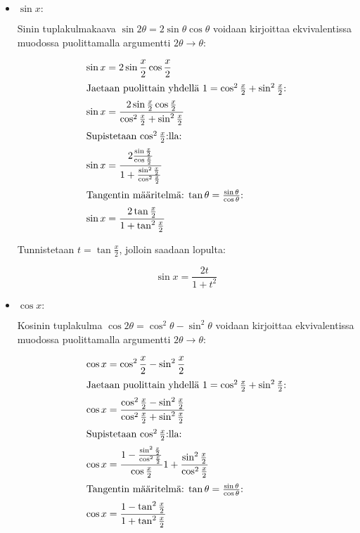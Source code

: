 \documentclass[../integrointiopas.tex]{subfiles}
\begin{document}
	\begin{itemize}
		\item \underline{$\sin x:$}
		
		Sinin tuplakulmakaava $\sin2\theta = 2\sin\theta\cos\theta$ voidaan kirjoittaa ekvivalentissa muodossa puolittamalla argumentti $2\theta\to\theta$:
		
		\begin{align}
			\sin x &= 2\sin\frac{x}{2}\cos\frac{x}{2} \\
			\intertext{Jaetaan puolittain yhdellä $1 = \cos^2\frac{x}{2} + \sin^2\frac{x}{2}$:}
			\sin x &= \frac{2\sin\frac{x}{2}\cos\frac{x}{2}}{\cos^2\frac{x}{2} + \sin^2\frac{x}{2}} \\
			\intertext{Supistetaan $\cos^2\frac{x}{2}$:lla:}
			\sin x &= \frac{2\frac{\sin\frac{x}{2}}{\cos\frac{x}{2}}}{1 + \frac{\sin^2\frac{x}{2}}{\cos^2\frac{x}{2}}} \\
			\intertext{Tangentin määritelmä: $\tan \theta = \frac{\sin\theta}{\cos\theta}$:}
			\sin x &= \frac{2\tan\frac{x}{2}}{1 + \tan^2\frac{x}{2}}
		\end{align}
	
		\noindent Tunnistetaan $t = \tan\frac{x}{2}$, jolloin saadaan lopulta:
	
		\begin{equation}
			\boxed{\sin x = \frac{2t}{1 + t^2}}
		\end{equation}
		
		\item \underline{$\cos x:$}
		
		Kosinin tuplakulma $\cos2\theta = \cos^2\theta - \sin^2\theta$ voidaan kirjoittaa ekvivalentissa muodossa puolittamalla argumentti $2\theta\to\theta$:
		
		\begin{align}
			\cos x &= \cos^2\frac{x}{2} - \sin^2\frac{x}{2} \\
			\intertext{Jaetaan puolittain yhdellä $1 = \cos^2\frac{x}{2} + \sin^2\frac{x}{2}$:}
			\cos x &= \frac{\cos^2\frac{x}{2} - \sin^2\frac{x}{2}}{\cos^2\frac{x}{2} + \sin^2\frac{x}{2}} \\
			\intertext{Supistetaan $\cos^2\frac{x}{2}$:lla:}
			\cos x &= \frac{1 - \frac{\sin^2\frac{x}{2}}{\cos^2\frac{x}{2}}}{\cos\frac{x}{2}}{1 + \frac{\sin^2\frac{x}{2}}{\cos^2\frac{x}{2}}} \\
			\intertext{Tangentin määritelmä: $\tan \theta = \frac{\sin\theta}{\cos\theta}$:}
			\cos x &= \frac{1 - \tan^2\frac{x}{2}}{1 + \tan^2\frac{x}{2}}
		\end{align}
	

\end{itemize}
\end{document}
